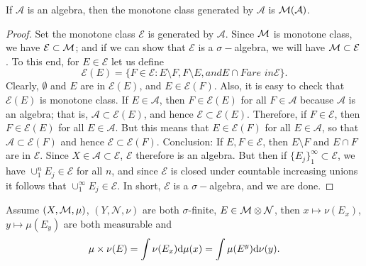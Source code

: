 \begin{lem}
    \label{Lem:MonotoneClassLemma}
    If $\mathcal{A}$ is an algebra, then the monotone class 
    generated by $\mathcal{A}$ is $\mathcal{M}(\mathcal{A})$.
\end{lem}
\begin{proof}
    Set the monotone class $\mathcal{E}$ is generated by 
    $\mathcal{A}$. Since $\mathcal{M}$ is monotone class, we have
    $\mathcal{E}\subset\mathcal{M}$; and if we can show that $\mathcal{E}$
    is a $\sigma-$algebra, we will have $\mathcal{M}\subset\mathcal{E}$.
    To this end, for $E\in\mathcal{E}$ let us define
    \begin{displaymath}
        \mathcal{E}(E)=\{F\in\mathcal{E}:E\setminus F,F\setminus E,
        \textit{and} E\cap F \textit{are in} \mathcal{E}\}.
    \end{displaymath}
    Clearly, $\emptyset$ and $E$ are in $\mathcal{E}(E)$, and 
    $E\in\mathcal{E}(F)$. Also, it is easy to check that $\mathcal{E}(E)$
    is monotone class. If $E\in\mathcal{A}$, then $F\in\mathcal{E}(E)$
    for all $F\in\mathcal{A}$ because $\mathcal{A}$ is an algebra; that is,
    $\mathcal{A}\subset\mathcal{E}(E)$, and hence $\mathcal{E}\subset
    \mathcal{E}(E)$. Therefore, if $F\in\mathcal{E}$, then $F\in
    \mathcal{E}(E)$ for all $E\in\mathcal{A}$. But this means that $E\in
    \mathcal{E}(F)$ for all $E\in\mathcal{A}$, so that $\mathcal{A}\subset
    \mathcal{E}(F)$ and hence $\mathcal{E}\subset\mathcal{E}(F)$. Conclusion:
    If $E,F\in\mathcal{E}$, then $E\setminus F$ and $E\cap F$ are in 
    $\mathcal{E}$. Since $X\in\mathcal{A}\subset\mathcal{E}$, $\mathcal{E}$ 
    therefore is an algebra. But then if $\{E_j\}_{1}^{\infty}\subset
    \mathcal{E}$, we have $\cup_{1}^{n}E_j\in\mathcal{E}$ for all $n$,
    and since $\mathcal{E}$ is closed under countable increasing unions
    it follows that $\cup_{1}^{\infty}E_j\in\mathcal{E}$. In short, 
    $\mathcal{E}$ is a $\sigma-$algebra, and we are done.
\end{proof}
\begin{thm}
    \label{Thm:MultipleIntForSimple}
    Assume $(X,\mathcal{M},\mu)$, $(Y,\mathcal{N},\nu)$ are both $\sigma$-finite, 
    $E\in\mathcal{M}\otimes\mathcal{N}$, then $x\mapsto\nu(E_x)$, 
    $y\mapsto\mu(E_y)$ are both measurable and 
    \begin{displaymath}
        \mu\times\nu(E)=\int\nu(E_x)\mathrm{d}\mu(x)=\int\mu(E^{y})\mathrm{d}\nu(y).
    \end{displaymath}
\end{thm}

